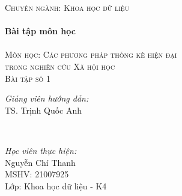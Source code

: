 \documentclass[14pt, a4paper]{article}
\theoremstyle{sltheorem}
\theoremstyle{soltheorem}
\begin{document}
\begin{titlepage}
    \textsc{\Large Chuyên ngành: Khoa học dữ liệu}\\[0.5cm] %



    \HRule \\[0.4cm]
    { \huge \bfseries Bài tập môn học}\\[0.4cm] %
    \HRule \\[1.5cm]

    \textsc{\Large Môn học: Các phương pháp thống kê hiện đại \\ trong nghiên cứu Xã hội học}\\[1cm] %


    \textsc{\Large Bài tập số 1}\\[1cm]


    \begin{minipage}{0.4\textwidth}
        \begin{flushleft} \large
        \emph{Giảng viên hướng dẫn:} \\
        TS. Trịnh Quốc Anh %
        \end{flushleft}
    \end{minipage}\\[0.5cm]

    \begin{minipage}{0.4\textwidth}
    \begin{flushleft} \large
    \emph{Học viên thực hiện:}\\
    Nguyễn Chí Thanh \\
    MSHV: 21007925 \\ %
    Lớp: Khoa học dữ liệu - K4
    \end{flushleft}
    \end{minipage}




\end{titlepage}
\end{document}
